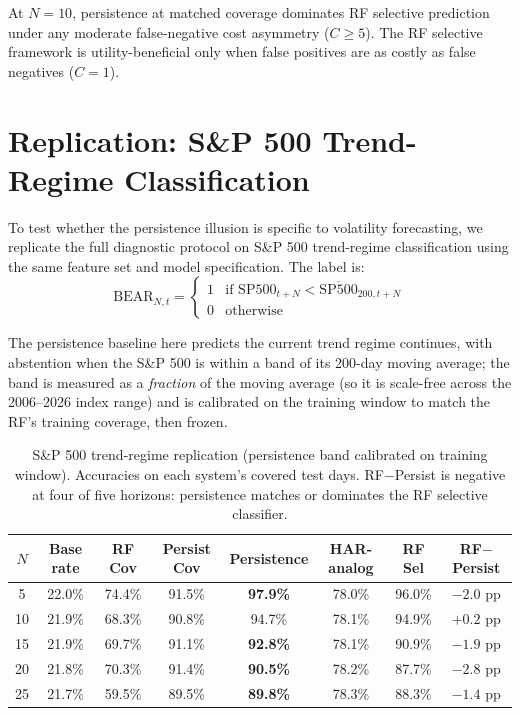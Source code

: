 \documentclass[12pt]{article}
\begin{document}
At $N = 10$, persistence at matched coverage dominates RF selective prediction under any moderate
false-negative cost asymmetry ($C \geq 5$). The RF selective framework is utility-beneficial only
when false positives are as costly as false negatives ($C = 1$).

\section{Replication: S\&P 500 Trend-Regime Classification}
\label{sec:replication}

To test whether the persistence illusion is specific to volatility forecasting, we replicate the
full diagnostic protocol on S\&P 500 trend-regime classification using the same feature set and
model specification. The label is:
\begin{equation}
    \text{BEAR}_{N,t} = \begin{cases} 1 & \text{if } \text{SP500}_{t+N} < \overline{\text{SP500}}_{200,t+N} \\ 0 & \text{otherwise} \end{cases}
\end{equation}

The persistence baseline here predicts the current trend regime continues, with abstention
when the S\&P 500 is within a band of its 200-day moving average; the band is measured as a
\emph{fraction} of the moving average (so it is scale-free across the 2006--2026 index range)
and is calibrated on the training window to match the RF's training coverage, then frozen.

\begin{table}[H]
\centering
\caption{S\&P 500 trend-regime replication (persistence band calibrated on training window).
Accuracies on each system's covered test days. RF$-$Persist is negative at four of five
horizons: persistence matches or dominates the RF selective classifier.}
\label{tab:sp500}
\begin{tabular}{cccccccc}
\toprule
$N$ & Base rate & RF Cov & Persist Cov & Persistence & HAR-analog & RF Sel & RF$-$Persist \\
\midrule
5  & 22.0\% & 74.4\% & 91.5\% & \textbf{97.9\%} & 78.0\% & 96.0\% & $-2.0$ pp \\
10 & 21.9\% & 68.3\% & 90.8\% & 94.7\%          & 78.1\% & 94.9\% & $+0.2$ pp \\
15 & 21.9\% & 69.7\% & 91.1\% & \textbf{92.8\%} & 78.1\% & 90.9\% & $-1.9$ pp \\
20 & 21.8\% & 70.3\% & 91.4\% & \textbf{90.5\%} & 78.2\% & 87.7\% & $-2.8$ pp \\
25 & 21.7\% & 59.5\% & 89.5\% & \textbf{89.8\%} & 78.3\% & 88.3\% & $-1.4$ pp \\
\bottomrule
\end{tabular}
\end{table}
\end{document}
